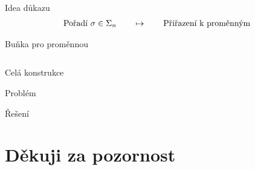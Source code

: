 \documentclass [14pt,xcolor=dvipsnames,aspectratio=169]{beamer}
\begin{document}
\begin{frame}{Idea důkazu}
    \begin{align*}
        \text{Pořadí $ \sigma \in \Sigma_n $}\qquad \mapsto \qquad \text{Přiřazení k proměnným}
    \end{align*}
    
\end{frame}

\begin{frame}{Buňka pro proměnnou}
\begin{columns}

\end{columns}
\end{frame}

\begin{frame}{Celá konstrukce}
    
\end{frame}

\begin{frame}{Problém}
    
\end{frame}

\begin{frame}{Řešení}
    
\end{frame}

\section*{Děkuji za pozornost}
\end{document}
